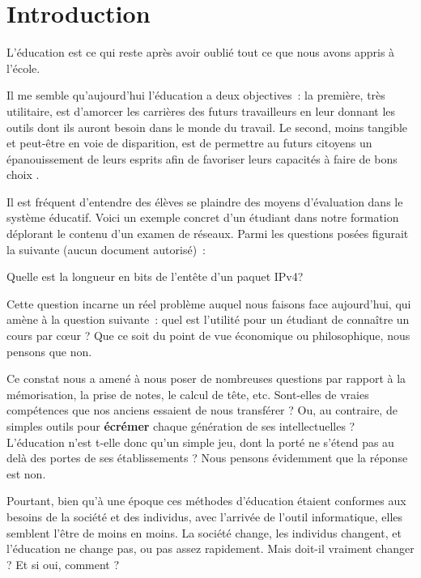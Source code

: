 
\chapter*{Introduction}\label{intro}

\begin{coolquote}
L'éducation est ce qui reste après avoir oublié tout ce que nous avons appris à l'école. 
\end{coolquote}

Il me semble qu'aujourd'hui l'éducation a deux objectives~: la première, très utilitaire, est d’amorcer les carrières des futurs travailleurs en leur donnant les outils dont ils auront besoin dans le monde du travail. Le second, moins tangible et peut-être en voie de disparition, est de permettre au futurs citoyens un épanouissement de leurs esprits afin de favoriser leurs capacités à \og faire de bons choix \fg{}.

Il est fréquent d'entendre des élèves se plaindre des moyens d'évaluation dans le système éducatif. Voici un exemple concret d'un étudiant dans notre formation déplorant le contenu d'un examen de réseaux. Parmi les questions posées figurait la suivante (aucun document autorisé)~:

\begin{coolquote}Quelle est la longueur en bits de l'entête d'un paquet IPv4?\end{coolquote}

Cette question incarne un réel problème auquel nous faisons face aujourd'hui, qui amène à la question suivante~: quel est l'utilité pour un étudiant de connaître un cours par c\oe{}ur ? Que ce soit du point de vue économique ou philosophique, nous pensons que non.

Ce constat nous a amené à nous poser de nombreuses questions par rapport à la mémorisation, la prise de notes, le calcul de tête, etc. Sont-elles de vraies compétences que nos anciens essaient de nous transférer ? Ou, au contraire, de simples outils pour \textbf{écrémer} chaque génération de ses intellectuelles ? L'éducation n'est t-elle donc qu'un simple jeu, dont la porté ne s'étend pas au delà des portes de ses établissements ? Nous pensons évidemment que la réponse est non.

Pourtant, bien qu'à une époque ces méthodes d'éducation étaient conformes aux besoins de la société et des individus, avec l'arrivée de l'outil informatique, elles semblent l'être de moins en moins. La société change, les individus changent, et l'éducation ne change pas, ou pas assez rapidement. Mais doit-il vraiment changer ? Et si oui, comment ?

